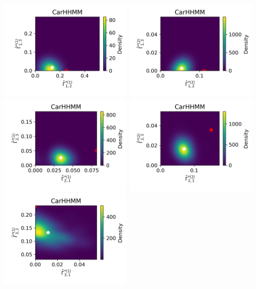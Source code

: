 \documentclass{article}
\begin{document}
\begin{center}
        \includegraphics[width=2.5in]{../Plots/hhmm_V_Gamma_density_0_row_0.png}
        \includegraphics[width=2.5in]{../Plots/hhmm_V_Gamma_density_1_row_0.png}
        \includegraphics[width=2.5in]{../Plots/hhmm_V_Gamma_density_0_row_1.png}
        \includegraphics[width=2.5in]{../Plots/hhmm_V_Gamma_density_1_row_1.png}
        \includegraphics[width=2.5in]{../Plots/hhmm_V_Gamma_density_0_row_2.png}

\end{center}
\end{document}
